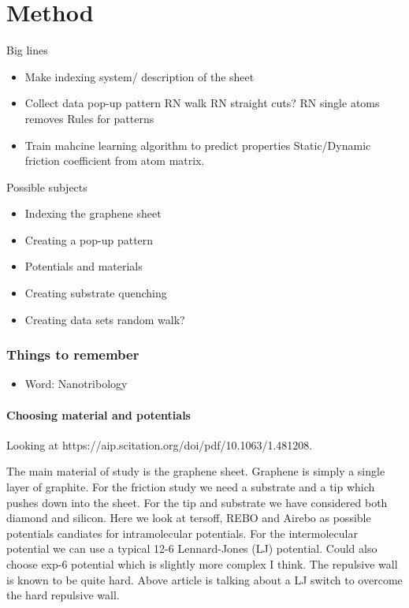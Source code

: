 \newpage
\chapter*{Method}

Big lines
\begin{itemize}
    \item Make indexing system/ description of the sheet 
    \item Collect data 
    \subitem pop-up pattern
    \subitem RN walk 
    \subitem RN straight cuts?
    \subitem RN single atoms removes
    \subitem Rules for patterns
    \item Train mahcine learning algorithm to predict properties
    \subitem Static/Dynamic friction coefficient from atom matrix. 
\end{itemize}    


Possible subjects
\begin{itemize}
    \item Indexing the graphene sheet
    \item Creating a pop-up pattern
    \item Potentials and materials
    \item Creating substrate
    \subitem quenching
    \item Creating data sets
    \subitem random walk?
\end{itemize}    


\subsection*{Things to remember}
\begin{itemize}
    \item Word: Nanotribology
\end{itemize}

\subsubsection*{Choosing material and potentials}

Looking at https://aip.scitation.org/doi/pdf/10.1063/1.481208.

The main material of study is the graphene sheet. Graphene is simply a single layer of graphite. For the friction study we need a substrate and a tip which pushes down into the sheet. For the tip and substrate we have considered both diamond and silicon. Here we look at tersoff, REBO and Airebo as possible potentials candiates for intramolecular potentials. For the intermolecular potential we can use a typical 12-6 Lennard-Jones (LJ) potential. Could also choose exp-6 potential which is slightly more complex I think. The repulsive wall is known to be quite hard. Above article is talking about a LJ switch to overcome the hard repulsive wall.  


